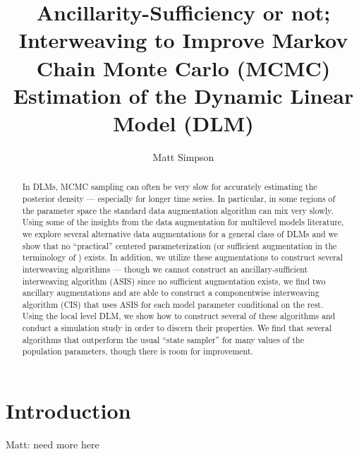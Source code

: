 \documentclass{article}
\newcommand{\matt}[1]{{\color{red} Matt: #1}}
\begin{document}
\title{Ancillarity-Sufficiency or not; Interweaving to Improve Markov Chain Monte Carlo (MCMC) Estimation of the Dynamic Linear Model (DLM)}
\author{Matt Simpson}
\maketitle

\begin{abstract}
In DLMs, MCMC sampling can often be very slow for accurately estimating the posterior density --- especially for longer time series. In particular, in some regions of the parameter space the standard data augmentation algorithm can mix very slowly. Using some of the insights from the data augmentation for multilevel models literature, we explore several alternative data augmentations for a general class of DLMs and we show that no ``practical'' centered parameterization (or sufficient augmentation in the terminology of \citet{yu2011center}) exists. In addition, we utilize these augmentations to construct several interweaving algorithms --- though we cannot construct an ancillary-sufficient interweaving algorithm (ASIS) since no sufficient augmentation exists, we find two ancillary augmentations and are able to construct a componentwise interweaving algorithm (CIS) that uses ASIS for each model parameter conditional on the rest. Using the local level DLM, we show how to construct several of these algorithms and conduct a simulation study in order to discern their properties. We find that several algorithms that outperform the usual ``state sampler'' for many values of the population parameters, though there is room for improvement.
\end{abstract}


\section{Introduction}\label{sec:Intro}

\matt{need more here}
\end{document}

